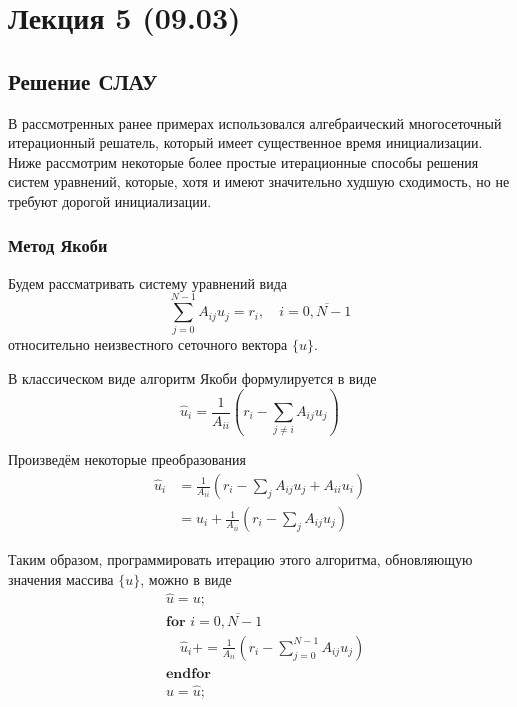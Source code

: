 \section{Лекция 5 (09.03)}
\subsection{Решение СЛАУ}

В рассмотренных ранее примерах использовался алгебраический
многосеточный итерационный решатель, который имеет существенное время
инициализации. Ниже рассмотрим некоторые более простые итерационные способы решения систем
уравнений, которые, хотя и имеют значительно худшую сходимость, но не требуют дорогой инициализации.

\subsubsection{Метод Якоби}
\label{sec:SLAE-Jacobi}

Будем рассматривать систему уравнений вида
\begin{equation*}
    \sum_{j=0}^{N-1} A_{ij} u_j = r_i, \quad i = \overline{0, N-1}
\end{equation*}
относительно неизвестного сеточного вектора $\{u\}$.

В классическом виде алгоритм Якоби формулируется в виде
\begin{equation*}
    \hat u_i = \frac{1}{A_{ii}}\left(r_i - \sum_{j\neq i} A_{ij}{u_j}\right)
\end{equation*}

Произведём некоторые преобразования
\begin{align*}
    \hat u_i &= \frac{1}{A_{ii}}\left(r_i - \sum_{j} A_{ij}{u_j} + A_{ii}u_i\right) \\
             &= u_i + \frac{1}{A_{ii}}\left(r_i - \sum_{j} A_{ij}{u_j}\right)
\end{align*}

Таким образом, программировать итерацию этого алгоритма, обновляющую значения массива $\{u\}$, можно в виде
\begin{align*}
    &\hat u = u; \\
    &\textbf{for } i=\overline{0, N-1} \\ 
    &\quad \hat u_i \mathrel{{+}{=}} \frac{1}{A_{ii}}\left(r_i - \sum_{j=0}^{N-1} A_{ij}{u_j}\right)\\
    &\textbf{endfor} \\
    & u = \hat u; \\
\end{align*}


